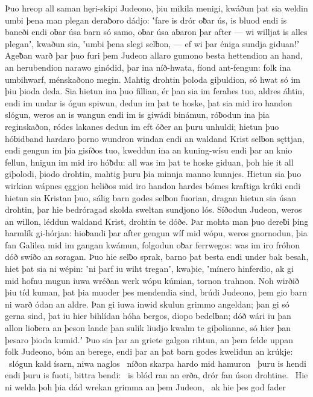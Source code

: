 Þuo hreop all saman hęri-skipi Judeono,
þiu mikila menigi, kwáðun þat sia weldin umbi þena man plegan
deraƀoro dádjo: ʽfare is drór oƀar ús,
is bluod endi is baneði endi oƀar úsa barn só samo,
oƀar úsa aƀaron þar after — wi willjat is alles pleganʼ, kwaðun sia,
ʽumbi þena slegi selƀon, — ef wi þar éniga sundja giduan!ʼ
Ageƀan warð þar þuo furi þem Judeon allaro gumono besta
hettendion an hand, an herubendion
narawo ginódid, þar ina níð-hwata,
fíond ant-fengun: folk ina umbihwarf,
ménskaðono megin. Mahtig drohtin
þoloda giþuldion, só hwat só im þiu þioda deda.
Sia hietun ina þuo fillian, ér þan sia im ferahes tuo,
aldres áhtin, endi im undar is ógun spiwun,
dedun im þat te hoske, þat sia mid iro handon slógun,
weros an is wangun endi im is giwádi binámun,
róƀodun ina þia reginskaðon, ródes lakanes
dedun im eft óðer an þuru unhuldi;
hietun þuo hóƀidband hardaro þorno
wundron windan endi an waldand Krist
selƀon sęttjan, endi gengun im þia gisíðos tuo,
kweddun ina an kuning-wísu endi þar an knio fellun,
hnigun im mid iro hóƀdu: all was im þat te hoske giduan,
þoh hie it all giþolodi, þiodo drohtin,
mahtig þuru þia minnja manno kunnjes.
Hietun sia þuo wirkian wápnes ęggjon
heliðos mid iro handon hardes bómes
kraftiga krúki endi hietun sia Kristan þuo,
sálig barn godes selƀon fuorian,
dragan hietun sia úsan drohtin, þar hie bedróragad skolda
sweltan sundjono lós. Síðodun Judeon,
weros an willon, léddun waldand Krist,
drohtin te dóðe. Þar mohta man þuo dereƀi þing
harmlík gi-hórjan: hioƀandi þar after
gengun wíf mid wópu, weros gnornodun,
þia fan Galilea mid im gangan kwámun,
folgodun oƀar ferrwegos: was im iro fróhon dóð
swíðo an soragan. Þuo hie selƀo sprak,
barno þat besta endi under bak besah,
hiet þat sia ni wépin: ʽni þarf iu wiht treganʼ, kwaþie,
ʽmínero hinferdio, ak gi mid hofnu mugun
iuwa wréðan werk wópu kúmian,
tornon trahnon. Noh wirðið þiu tíd kuman,
þat þia muoder þes mendendia sind,
brúdi Judeono, þem gio barn ni warð
ódan an aldre. Þan gi iuwa inwid skulun
grimmo angeldan; þan gi só gerna sind,
þat iu hier bihlídan hóha bergos,
diopo bedelƀan; dóð wári iu þan allon
lioƀera an þeson lande þan sulik liudjo kwalm
te giþolianne, só hier þan þesaro þioda kumid.ʼ
Þuo sia þar an griete galgon rihtun,
an þem felde uppan folk Judeono,
bóm an berege, endi þar an þat barn godes
kwelidun an krúkje: \hld\ slógun kald ísarn,
niwa naglos \hld\ níðon skarpa
hardo mid hamuron \hld\ þuru is hendi endi þuru is fuoti,
bittra bendi: \hld\ is blód ran an erða,
drór fan úson drohtine. \hld\ Hie ni welda þoh þia dád wrekan
grimma an þem Judeon, \hld\ ak hie þes god fader
